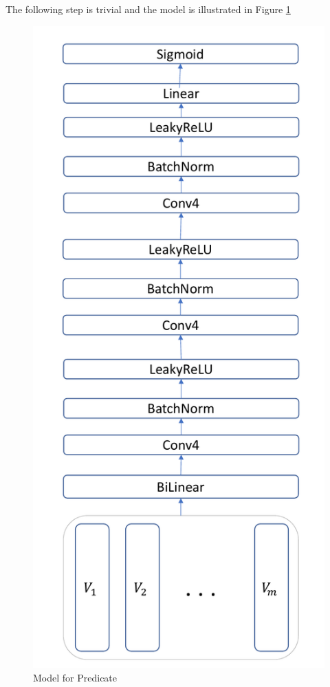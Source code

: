 The following step is trivial and the model is illustrated in Figure \ref{fig:CLTN_predicate}

\begin{figure}
    \centering
    \includegraphics[width=.4\textwidth]{img/CLTN_Predicate.pdf}
    \caption{Model for Predicate}
    \label{fig:CLTN_predicate}
\end{figure}
